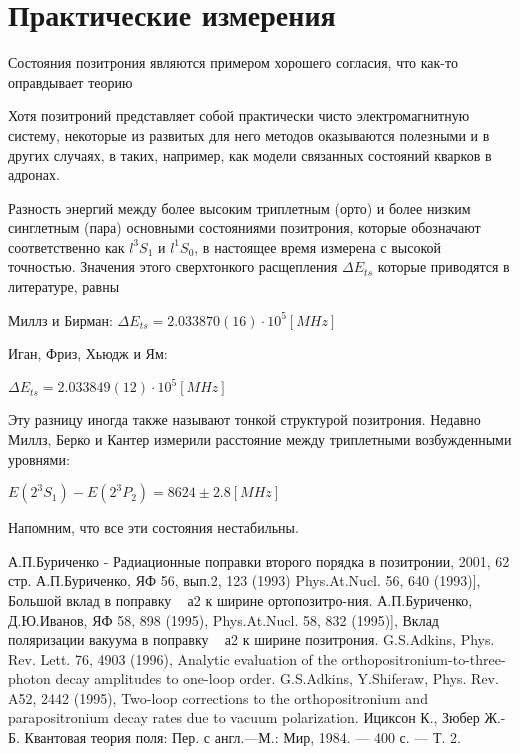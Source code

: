 \documentclass[a4paper,14pt,russian]{article}
\begin{document}
\section{Практические измерения}

Состояния позитрония являются примером хорошего согласия, что как-то оправдывает теорию

Хотя позитроний представляет собой практически чисто электромагнитную систему, некоторые из развитых для него методов оказываются полезными и в других случаях, в таких, например, как модели связанных состояний кварков в адронах.

Разность энергий между более высоким триплетным (орто) и более низким синглетным (пара) основными состояниями позитрония, которые обозначают соответственно как $l^3S_1$ и $l^1S_0$, в настоящее время измерена с высокой точностью. Значения этого сверхтонкого расщепления $\Delta E_{ts}$ которые приводятся в литературе, равны

Миллз и Бирман:
$
\Delta E_{ts} = 2.033870 (16) \cdot 10^5 [MHz]
$

Иган, Фриз, Хьюдж и Ям:

$
\Delta E_{ts} = 2.033849 (12) \cdot 10^5 [MHz]
$

Эту разницу иногда также называют тонкой структурой позитрония. Недавно \cite{f} Миллз, Берко и Кантер измерили расстояние между  триплетными возбужденными уровнями:

$
E(2^3S_1) - E(2^3P_2) = 8624 \pm 2.8 [MHz]
$

Напомним, что все эти состояния нестабильны.

\newpage 
\begin{thebibliography}{0} %
А.П.Буриченко - Радиационные поправки второго порядка в позитронии, 2001, 62 стр. 
А.П.Буриченко, ЯФ 56, вып.2, 123 (1993) Phys.At.Nucl. 56, 640 (1993)], Большой вклад в поправку ~ а2 к ширине ортопозитро-ния.
А.П.Буриченко, Д.Ю.Иванов, ЯФ 58, 898 (1995), Phys.At.Nucl. 58, 832 (1995)], Вклад поляризации вакуума в поправку ~ а2 к ширине позитрония.
G.S.Adkins, Phys. Rev. Lett. 76, 4903 (1996), Analytic evaluation of the orthopositronium-to-three-photon decay amplitudes to one-loop order.
G.S.Adkins, Y.Shiferaw, Phys. Rev. A52, 2442 (1995), Two-loop corrections to the orthopositronium and parapositronium decay rates due to vacuum polarization.
Ициксон К., Зюбер Ж.-Б. Квантовая теория поля: Пер. с англ.—М.: Мир, 1984. — 400 с. — Т. 2.
\end{thebibliography}
\end{document}
